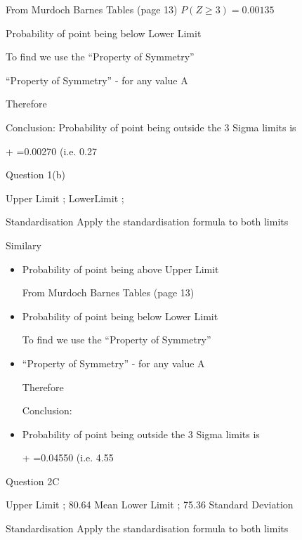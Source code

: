 \documentclass[]{report}
\begin{document}
From Murdoch Barnes Tables (page 13)  $P(Z \geq 3)=0.00135$

Probability of point being below Lower Limit


To find   we use the “Property of Symmetry”

“Property of Symmetry” -   for any value A

Therefore 

Conclusion: 
Probability of point being outside the 3 Sigma limits is

+ =0.00270 	(i.e. 0.27%
















Question 1(b)

Upper Limit ;  
LowerLimit ;  

Standardisation
Apply the standardisation formula	 	to both limits


Similary


\begin{itemize}
\item Probability of point being above Upper Limit

From Murdoch Barnes Tables (page 13)  

\item Probability of point being below Lower Limit


To find   we use the “Property of Symmetry”

\item “Property of Symmetry” -   for any value A

Therefore 

Conclusion: 
\item Probability of point being outside the 3 Sigma limits is

+ =0.04550 	(i.e. 4.55%
\end{itemize}















Question 2C

Upper Limit ; 80.64		Mean		 	
Lower Limit ; 75.36		Standard Deviation	 

Standardisation
Apply the standardisation formula	 	to both limits
\end{document}
